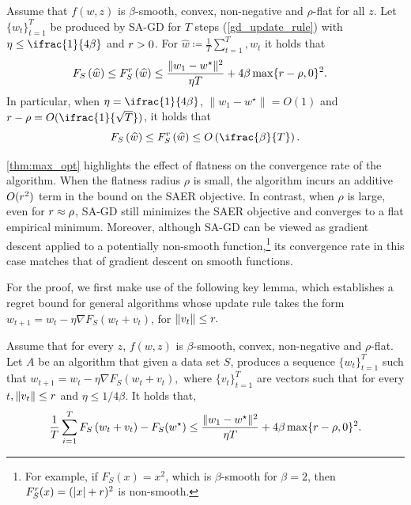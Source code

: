 \begin{theorem} \label{thm:max_opt}
Assume that $f(w,z)$ is $\beta$-smooth, convex, non-negative and $\rho$-flat for all $z$. Let $\{w_t\}_{t=1}^T$ be produced by SA-GD for $T$ steps
(\cref{gd_update_rule}) with $\eta \leq \ifrac{1}{4\beta}$ and $r >0$. For $\widehat{w} \coloneqq \frac{1}{T}\sum_{t=1}^T, w_t$ it
holds that
\begin{align*}
    F_S\left(\widehat{w}\right)\leq F_S^{r}\left(\widehat{w}\right)
    &\leq
    \frac{\|w_1-w^\star\|^2}{\eta T} + 4\beta\max\{r - \rho, 0\}^2
    .
\end{align*}
In particular, when $\eta=\ifrac{1}{4\beta}$, $\|w_1-w^\star\|=O(1)$ and $\rad-\rho=O(\ifrac{1}{\sqrt{T}})$, it holds that $$
F_S\left(\widehat{w}\right)\leq \fsmax\left(\widehat{w}\right)
    \leq
    O\left(\ifrac{\beta}{T}\right).$$
\end{theorem}

\cref{thm:max_opt} highlights the effect of flatness on the convergence rate of the algorithm.
When the flatness radius $\rho$ is small, the algorithm incurs an additive $O(r^2)$ term in the bound on the SAER objective. In contrast, when $\rho$ is large, even for $r \approx \rho$, SA-GD still minimizes the SAER objective and converges to a flat empirical minimum. Moreover, although SA-GD can be viewed as gradient descent applied to a potentially non-smooth function,\footnote{For example, if $F_S(x)=x^2$, which is $\beta$-smooth for $\beta=2$, then $F_S^{r}(x) = (|x|+r)^2$ is non-smooth.} its convergence rate in this case matches that of gradient descent on smooth functions.

For the proof, we first make use of the following key lemma, which establishes a regret bound for general algorithms whose update rule takes the form
$
w_{t+1} = w_t - \eta \nabla F_S(w_t + v_t)$, for $ \|v_t\| \leq r.
$

\begin{lemma}
\label{lem:gen_regret}
Assume that for every $z$, $f(w,z)$ is $\beta$-smooth, convex, non-negative and $\rho$-flat. Let $A$ be an algorithm that given a data set $S$, produces a sequence $\{w_t\}_{t=1}^T$ such that $
w_{t+1} = w_t - \eta \nabla F_S(w_t+v_t),$
 where $\{v_t\}_{t=1}^T$ are vectors such that for every $t$$, \|v_t\|\leq r$ and $\eta\leq 1/4\beta$. It holds that,
 \begin{equation*}
      \frac{1}{T}\sum_{i=1}^T F_S\left(w_t+v_t\right)-F_S(w^\star)  \leq 
    \frac{\|w_1-w^\star\|^2}{\eta T} + 4\beta\max\{r - \rho, 0\}^2.
 \end{equation*}
\end{lemma}

